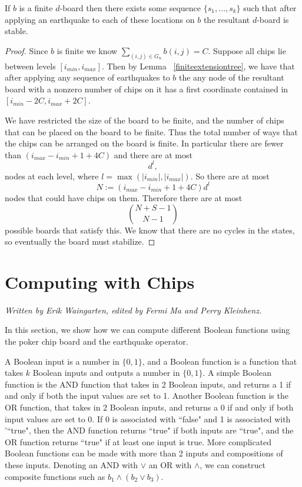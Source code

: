 \documentclass[runningheads,a4paper]{llncs}
\begin{document}
\begin{theorem} If $b$ is a finite $d$-board then there exists some sequence $\{s_1, \ldots, s_k\}$ such that after applying an earthquake to each of these locations on $b$ the resultant $d$-board is stable.
\end{theorem}
\begin{proof}
 Since $b$ is finite we know $\sum_{(i,j) \in G_n} b(i,j) = C$. Suppose all chips lie between levels  $[i_{min}, i_{max}]$. Then by Lemma ~\ref{finiteextensiontree}, we have that after applying any sequence of earthquakes to $b$ the any node of the resultant board with a nonzero number of chips on it has a first coordinate contained in $ [i_{min} -2C, i_{max} +2C]$.

We have restricted the size of the board to be finite, and the number of chips that can be placed on the board to be finite. 
Thus the total number of ways that the chips can be arranged on the board is finite. 
In particular there are fewer than $(i_{max} - i_{min}+1 + 4 C)$  and there are at most 
\begin{equation}
d^l,
\end{equation}
nodes at each level, where $l= \max(|i_{min}|, |i_{max}|)$. So there are at most 
\begin{equation}
N:=(i_{max} - i_{min}+1 + 4 C)d^l
\end{equation}
nodes that could have chips on them. Therefore there are at most 
\begin{equation}
\binom{N+S-1}{N-1}
\end{equation}
possible boards that satisfy this. We know that there are no cycles in the states, so eventually the board must stabilize.
\end{proof}


\section{Computing with Chips}
\label{Computing with Chips}

\emph{Written by Erik Waingarten, edited by Fermi Ma and Perry Kleinhenz.}

In this section, we show how we can compute different Boolean functions using the poker chip board and the earthquake operator.

A Boolean input is a number in $\{0,1\}$, and a Boolean function is a function that takes $k$ Boolean inputs and outputs a number in $\{0,1\}$. A simple Boolean function is the AND function that takes in 2 Boolean inputs, and returns a 1 if and only if both the input values are set to 1. Another Boolean function is the OR function, that takes in 2 Boolean inputs, and returns a 0 if and only if both input values are set to 0. If 0 is associated with ``false" and 1 is associated with '``true", then the AND function returns ``true" if both inputs are ``true", and the OR function returns ``true" if at least one input is true. More complicated Boolean functions can be made with more than 2 inputs and compositions of these inputs. Denoting an AND with $\vee$ an OR with $\wedge$, we can construct composite functions such as $b_1 \wedge (b_2 \vee b_3)$. 
\end{document}
